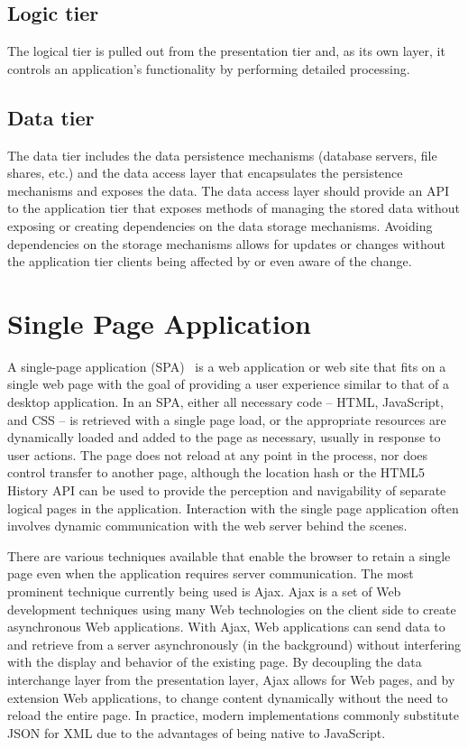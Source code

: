 \subsection{Logic tier}
The logical tier is pulled out from the presentation tier and, as its own layer, it controls an application’s functionality by performing detailed processing.

\subsection{Data tier}
The data tier includes the data persistence mechanisms (database servers, file shares, etc.) and the data access layer that encapsulates the persistence mechanisms and exposes the data. The data access layer should provide an API to the application tier that exposes methods of managing the stored data without exposing or creating dependencies on the data storage mechanisms. Avoiding dependencies on the storage mechanisms allows for updates or changes without the application tier clients being affected by or even aware of the change.




\section{Single Page Application}
A single-page application (SPA)~\cite{mikowski2013single} is a web application or web site that fits on a single web page with the goal of providing a user experience similar to that of a desktop application. In an SPA, either all necessary code – HTML, JavaScript, and CSS – is retrieved with a single page load, or the appropriate resources are dynamically loaded and added to the page as necessary, usually in response to user actions. The page does not reload at any point in the process, nor does control transfer to another page, although the location hash or the HTML5 History API can be used to provide the perception and navigability of separate logical pages in the application. Interaction with the single page application often involves dynamic communication with the web server behind the scenes.\par
	There are various techniques available that enable the browser to retain a single page even when the application requires server communication. The most prominent technique currently being used is Ajax. Ajax is a set of Web development techniques using many Web technologies on the client side to create asynchronous Web applications. With Ajax, Web applications can send data to and retrieve from a server asynchronously (in the background) without interfering with the display and behavior of the existing page. By decoupling the data interchange layer from the presentation layer, Ajax allows for Web pages, and by extension Web applications, to change content dynamically without the need to reload the entire page. In practice, modern implementations commonly substitute JSON for XML due to the advantages of being native to JavaScript.







